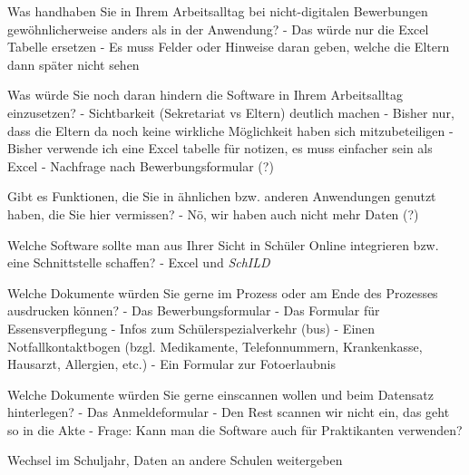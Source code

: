 Was handhaben Sie in Ihrem Arbeitsalltag bei nicht-digitalen Bewerbungen gewöhnlicherweise anders als in der Anwendung?		
- Das würde nur die Excel Tabelle ersetzen
- Es muss Felder oder Hinweise daran geben, welche die Eltern dann später nicht sehen














Was würde Sie noch daran hindern die Software in Ihrem Arbeitsalltag einzusetzen?	
 - Sichtbarkeit (Sekretariat vs Eltern) deutlich machen		
- Bisher nur, dass die Eltern da noch keine wirkliche Möglichkeit haben sich mitzubeteiligen
- Bisher verwende ich eine Excel tabelle für notizen, es muss einfacher sein als Excel
- Nachfrage nach Bewerbungsformular (?)














Gibt es Funktionen, die Sie in ähnlichen bzw. anderen Anwendungen genutzt haben, die Sie hier vermissen?		
- Nö, wir haben auch nicht mehr Daten (?)









Welche Software sollte man aus Ihrer Sicht in Schüler Online integrieren bzw. eine Schnittstelle schaffen? 		
- Excel und  \textit{SchILD} 



						
Welche Dokumente würden Sie gerne im Prozess oder am Ende des Prozesses ausdrucken können?		
- Das Bewerbungsformular
- Das Formular für Essensverpflegung
- Infos zum Schülerspezialverkehr (bus)
- Einen Notfallkontaktbogen (bzgl. Medikamente, Telefonnummern, Krankenkasse, Hausarzt, Allergien, etc.)
- Ein Formular zur Fotoerlaubnis

Welche Dokumente würden Sie gerne einscannen wollen und beim Datensatz hinterlegen?
- Das Anmeldeformular 
- Den Rest scannen wir nicht ein, das geht so in die Akte
- Frage: Kann man die Software auch für Praktikanten verwenden?


Wechsel im Schuljahr, Daten an andere Schulen weitergeben
					